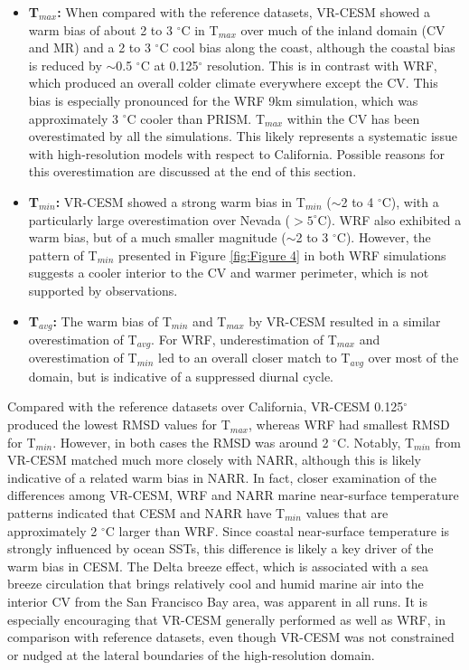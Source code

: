 
\begin{itemize}
\item{} \textbf{T$_{max}$:}  When compared with the reference datasets, VR-CESM showed a warm bias of about 2 to 3 $^\circ$C in T$_{max}$ over much of the inland domain (CV and MR) and a 2 to 3 $^\circ$C cool bias along the coast, although the coastal bias is reduced by $\sim$0.5 $^\circ$C at 0.125$^\circ$ resolution. This is in contrast with WRF, which produced an overall colder climate everywhere except the CV.  This bias is especially pronounced for the WRF 9km simulation, which was approximately 3 $^\circ$C cooler than PRISM. T$_{max}$ within the CV has been overestimated by all the simulations. This likely represents a systematic issue with high-resolution models with respect to California.  Possible reasons for this overestimation are discussed at the end of this section.


\item{} \textbf{T$_{min}$:}  VR-CESM showed a strong warm bias in T$_{min}$ ($\sim$2 to 4 $^\circ$C), with a particularly large overestimation over Nevada ($> 5 ^\circ$C). WRF also exhibited a warm bias, but of a much smaller magnitude ($\sim$2 to 3 $^\circ$C). However, the pattern of T$_{min}$ presented in Figure \ref{fig:Figure 4} in both WRF simulations suggests a cooler interior to the CV and warmer perimeter, which is not supported by observations.

\item{} \textbf{T$_{avg}$:}  The warm bias of T$_{min}$ and T$_{max}$ by VR-CESM resulted in a similar overestimation of T$_{avg}$. For WRF, underestimation of T$_{max}$ and overestimation of T$_{min}$ led to an overall closer match to T$_{avg}$ over most of the domain, but is indicative of a suppressed diurnal cycle.
\end{itemize}

Compared with the reference datasets over California, VR-CESM 0.125$^\circ$ produced the lowest RMSD values for T$_{max}$, whereas WRF had smallest RMSD for T$_{min}$.  However, in both cases the RMSD was around 2 $^\circ$C.  Notably, T$_{min}$ from VR-CESM matched much more closely with NARR, although this is likely indicative of a related warm bias in NARR.  In fact, closer examination of the differences among VR-CESM, WRF and NARR marine near-surface temperature patterns indicated that CESM and NARR have T$_{min}$ values that are approximately 2 $^\circ$C larger than WRF.  Since coastal near-surface temperature is strongly influenced by ocean SSTs, this difference is likely a key driver of the warm bias in CESM. The Delta breeze effect, which is associated with a sea breeze circulation that brings relatively cool and humid marine air into the interior CV from the San Francisco Bay area, was apparent in all runs. It is especially encouraging that VR-CESM generally performed as well as WRF, in comparison with reference datasets, even though VR-CESM was not constrained or nudged at the lateral boundaries of the high-resolution domain.

